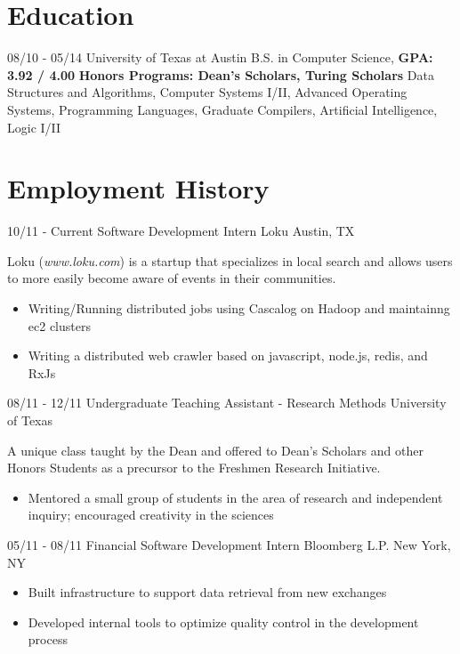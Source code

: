 \documentclass[11pt,letter,sans]{moderncv}
\begin{document}
\maketitle

\section{Education}
\cventry
{08/10 - 05/14}
{University of Texas at Austin}
{B.S. in Computer Science, \textbf{GPA: 3.92 / 4.00}}
{}
{}
{\textbf{Honors Programs: Dean's Scholars, Turing Scholars}}
{ Data Structures and Algorithms, Computer
  Systems I/II, Advanced Operating Systems, Programming Languages, Graduate
Compilers, Artificial Intelligence, Logic I/II}


\section{Employment History}
\cventry
{10/11 - Current}
{Software Development Intern}
{Loku}
{Austin, TX}
{}
{Loku (\textit{www.loku.com}) is a startup that specializes in local search and
  allows users to more easily become aware of events in their communities.
  \begin{itemize}
    \item Writing/Running distributed jobs using Cascalog on Hadoop and
      maintainng ec2 clusters
    \item Writing a distributed web crawler based on javascript, node.js, redis, and RxJs
\end{itemize}}

\cventry
{08/11 - 12/11}
{Undergraduate Teaching Assistant - Research Methods}
{University of Texas}
{}
{}
{A unique class taught by the Dean and offered to Dean's Scholars and other
  Honors Students as a precursor to the Freshmen Research Initiative.
  \begin{itemize}
    \item Mentored a small group of students in the area of research and
      independent inquiry; encouraged creativity in the sciences
\end{itemize}}

\cventry
{05/11 - 08/11}
{Financial Software Development Intern}
{Bloomberg L.P.}
{New York, NY}
{}
{
  \begin{itemize}
    \item Built infrastructure to support data retrieval from new exchanges
    \item Developed internal tools to optimize quality control in the
      development process
\end{itemize}}
\end{document}
